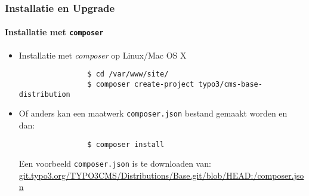 \begin{frame}[fragile]
	\frametitle{Installatie en Upgrade}
	\framesubtitle{Installatie met \texttt{composer}}

	\begin{itemize}
		\item Installatie met \textit{composer} op Linux/Mac OS X

			\begin{lstlisting}
				$ cd /var/www/site/
				$ composer create-project typo3/cms-base-distribution
			\end{lstlisting}

		\item Of anders kan een maatwerk \texttt{composer.json} bestand gemaakt worden en dan:

			\begin{lstlisting}
				$ composer install
			\end{lstlisting}

			Een voorbeeld \texttt{composer.json} is te downloaden van:\newline
			\small
				\href{https://git.typo3.org/TYPO3CMS/Distributions/Base.git/blob/HEAD:/composer.json}{git.typo3.org/TYPO3CMS/Distributions/Base.git/blob/HEAD:/composer.json}
			\normalsize


	\end{itemize}
\end{frame}

